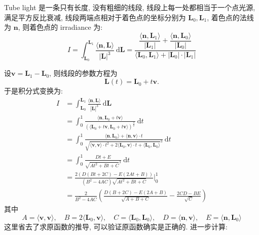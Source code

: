 Tube light 是一条只有长度, 没有粗细的线段, 线段上每一处都相当于一个点光源, 满足平方反比衰减, 线段两端点相对于着色点的坐标分别为 $\mathbf{L}_0, \mathbf{L}_1$, 着色点的法线为 $\mathbf{n}$, 则着色点的 irradiance 为:
\[I = \int_{\mathbf{L}_0}^{\mathbf{L}_1}\frac{\langle \mathbf{n},\mathbf{L} \rangle}{|\mathbf{L}|^3}\ \mathrm{d}\mathbf{L} = \frac{\dfrac{\langle\mathbf{n},\mathbf{L}_1\rangle}{|\mathbf{L}_1|}+\dfrac{\langle\mathbf{n},\mathbf{L}_0\rangle}{|\mathbf{L}_0|} }{\langle\mathbf{L}_0,\mathbf{L}_1\rangle + |\mathbf{L}_0|\cdot|\mathbf{L}_1|}\]

设$\mathbf{v} = \mathbf{L}_1 - \mathbf{L}_0$, 则线段的参数方程为 
\[
\mathbf{L}(t) = \mathbf{L}_0 + t\mathbf{v}.
\]
于是积分式变换为:
\begin{align*}
I &= \int_{\mathbf{L}_0}^{\mathbf{L}_1}\frac{\langle \mathbf{n},\mathbf{L} \rangle}{|\mathbf{L}|^3}\ \mathrm{d}\mathbf{L} \\
&= \int_0^1\frac{\langle \mathbf{n}, \mathbf{L}_0+t\mathbf{v} \rangle}{(\langle \mathbf{L}_0+t\mathbf{v},\mathbf{L}_0+t\mathbf{v}\rangle)^{\frac{3}{2}}}\ \mathrm{d}t \\
&= \int_0^1\frac{\langle\mathbf{n},\mathbf{L}_0\rangle + \langle\mathbf{n},\mathbf{v}\rangle\cdot t}{\sqrt{\langle\mathbf{v},\mathbf{v}\rangle\cdot t^2 + 2\langle\mathbf{L}_0,\mathbf{v}\rangle\cdot t + \langle\mathbf{L}_0,\mathbf{L}_0\rangle}^3}\ \mathrm{d}t \\
&= \int_0^1\frac{Dt+E}{\sqrt{At^2+Bt+C}^3}\ \mathrm{d}t \\
&= \frac{2(D(Bt+2C) - E(2At+B))}{(B^2-4AC)\sqrt{At^2+Bt+C}}\bigg|_0^1\\
&= \frac{2}{B^2-4AC}\left(\frac{D(B + 2C) - E(2A+B)}{\sqrt{A+B+C}} - \frac{2CD - BE}{\sqrt{C}}\right)
\end{align*}
其中
\[
A = \langle\mathbf{v},\mathbf{v}\rangle, \quad
B = 2\langle\mathbf{L}_0,\mathbf{v}\rangle, \quad
C = \langle\mathbf{L}_0,\mathbf{L}_0\rangle, \quad
D = \langle\mathbf{n},\mathbf{v}\rangle,\quad 
E = \langle\mathbf{n},\mathbf{L}_0\rangle
\]
这里省去了求原函数的推导, 可以验证原函数确实是正确的. 进一步计算:
